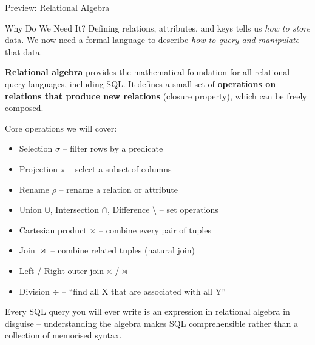 \begin{frame}{Preview: Relational Algebra}
  \begin{block}{Why Do We Need It?}
    Defining relations, attributes, and keys tells us \emph{how to store}
    data.  We now need a formal language to describe \emph{how to query
    and manipulate} that data.
  \end{block}

  \textbf{Relational algebra} provides the mathematical foundation for all
  relational query languages, including SQL.  It defines a small set of
  \textbf{operations on relations that produce new relations} (closure property),
  which can be freely composed.

  \medskip
  Core operations we will cover:

  \begin{itemize}
    \item Selection $\sigma$ -- filter rows by a predicate
    \item Projection $\pi$ -- select a subset of columns
    \item Rename $\rho$ -- rename a relation or attribute
    \item Union $\cup$, Intersection $\cap$, Difference $\setminus$ -- set operations
    \item Cartesian product $\times$ -- combine every pair of tuples
    \item Join $\bowtie$ -- combine related tuples (natural join)
    \item Left / Right outer join $\ltimes$ / $\rtimes$
    \item Division $\div$ -- ``find all X that are associated with all Y''
  \end{itemize}

  Every SQL query you will ever write is an expression in relational algebra
  in disguise -- understanding the algebra makes SQL comprehensible rather
  than a collection of memorised syntax.
\end{frame}

